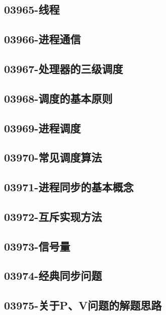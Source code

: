 \subsection{03965-线程}

\subsection{03966-进程通信}

\subsection{03967-处理器的三级调度}

\subsection{03968-调度的基本原则}

\subsection{03969-进程调度}

\subsection{03970-常见调度算法}

\subsection{03971-进程同步的基本概念}

\subsection{03972-互斥实现方法}

\subsection{03973-信号量}

\subsection{03974-经典同步问题}

\subsection{03975-关于P、V问题的解题思路}

